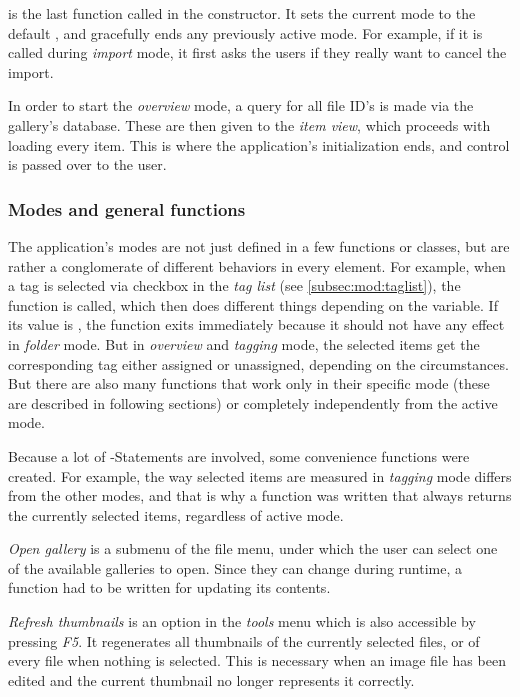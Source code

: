  is the last function called in the constructor. It sets the current mode
to the default , and gracefully ends any previously active
mode. For example, if it is called during \emph{import} mode, it first asks the users if they really want to cancel the import.

In order to start the \emph{overview} mode, a query for all file ID's is made via the
gallery's database. These are then given to the \emph{item view}, which proceeds
with loading every item. This is where the application's initialization
ends, and control is passed over to the user. 

\subsubsection{Modes and general functions}

The application's modes are not just defined in a few functions or classes, but are rather a conglomerate of 
different behaviors in every element. For example, when a tag is selected via checkbox in the \emph{tag list} (see \cref{subsec:mod:taglist}), the function  is called, which then does different things depending on the  variable. If its value is , the function exits immediately because it should not have any effect in \emph{folder} mode. But in \emph{overview} and \emph{tagging} mode, the selected items get the corresponding tag either assigned or unassigned, depending on the circumstances. But there are also many functions that work only in their specific mode (these are described in following sections) or completely independently from the active mode.

Because a lot of -Statements are involved, some convenience functions were created. For example, the way selected items are measured in \emph{tagging} mode differs from the other modes, and that is why a function was written that always returns the currently selected items, regardless of active mode.

\emph{Open gallery} is a submenu of the file menu, under which the user can
select one of the available galleries to open. Since they can change during
runtime, a function had to be written for updating its contents.

\emph{Refresh thumbnails} is an option in the \emph{tools} menu which is also accessible by pressing \emph{F5}. It regenerates all thumbnails of the currently selected files, or of every file when nothing is selected. This is necessary when an image file has been edited and the current thumbnail no longer represents it correctly.

